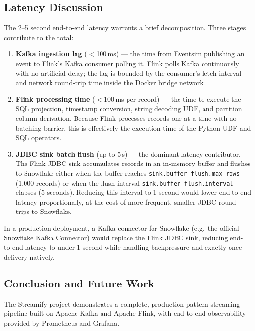 \subsection{Latency Discussion}

The 2–5 second end-to-end latency warrants a brief decomposition.
Three stages contribute to the total:

\begin{enumerate}
  \item \textbf{Kafka ingestion lag} ($<$100\,ms) — the time from Eventsim publishing an event
        to Flink's Kafka consumer polling it.
        Flink polls Kafka continuously with no artificial delay; the lag is bounded by the
        consumer's fetch interval and network round-trip time inside the Docker bridge network.
  \item \textbf{Flink processing time} ($<$100\,ms per record) — the time to execute the SQL
        projection, timestamp conversion, string decoding UDF, and partition column derivation.
        Because Flink processes records one at a time with no batching barrier,
        this is effectively the execution time of the Python UDF and SQL operators.
  \item \textbf{JDBC sink batch flush} (up to 5\,s) — the dominant latency contributor.
        The Flink JDBC sink accumulates records in an in-memory buffer and flushes to Snowflake
        either when the buffer reaches \texttt{sink.buffer-flush.max-rows} (1,000 records)
        or when the flush interval \texttt{sink.buffer-flush.interval} elapses (5 seconds).
        Reducing this interval to 1 second would lower end-to-end latency proportionally,
        at the cost of more frequent, smaller JDBC round trips to Snowflake.
\end{enumerate}

In a production deployment, a Kafka connector for Snowflake (e.g.\ the official Snowflake Kafka
Connector) would replace the Flink JDBC sink, reducing end-to-end latency to under 1 second
while handling backpressure and exactly-once delivery natively.

\subsection{Conclusion and Future Work}

The Streamify project demonstrates a complete, production-pattern streaming pipeline built
on Apache Kafka and Apache Flink, with end-to-end observability provided by Prometheus and Grafana.


